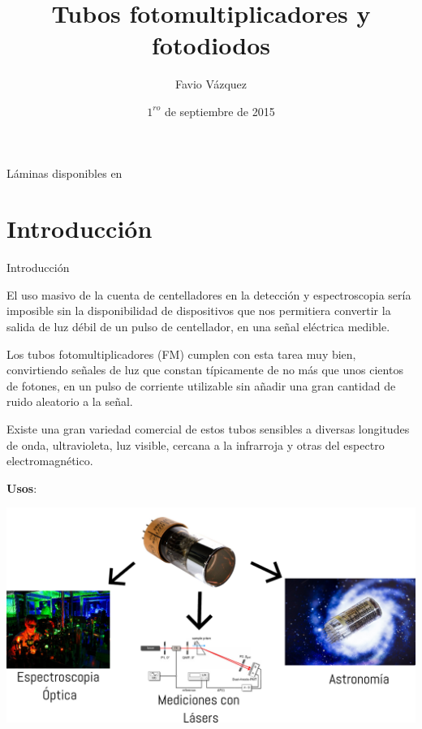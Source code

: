 \documentclass[a4paper,10pt]{beamer}
\begin{document}
\begin{frame}
\title{Tubos fotomultiplicadores y fotodiodos}
\author{Favio Vázquez}
\date{$1^{ro}$ de septiembre de 2015}

\Large{Láminas disponibles en }
\maketitle
\end{frame}

\section[\'Indice]{}

\section{Introducción}
\begin{frame}[allowframebreaks]{Introducción}
\begin{justify}
 El uso masivo de la cuenta de centelladores en la detección y espectroscopia sería 
 imposible sin la disponibilidad de dispositivos que nos permitiera convertir la 
 salida de luz débil de un pulso de centellador, en una señal eléctrica medible. 
 
 \vspace{.3cm}
 
 Los tubos fotomultiplicadores (FM) cumplen con esta tarea muy bien, convirtiendo señales 
 de luz que constan típicamente de no más que unos cientos de fotones, en un pulso 
 de corriente utilizable sin añadir una gran cantidad de ruido aleatorio a la señal.
 
\framebreak

 Existe una gran variedad comercial de estos tubos sensibles a diversas longitudes de onda,
 ultravioleta, luz visible, cercana a la infrarroja y otras del espectro electromagnético.
 
 \vspace{.3cm}
 
 \textbf{Usos}:
 
 \begin{center}
   \includegraphics[scale=0.2]{fig1}
 \end{center}

 
 \end{justify}
\end{frame}
\end{document}
